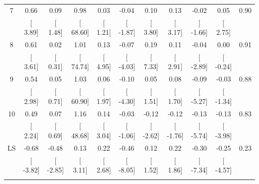 \documentclass[12pt]{article}
\begin{document}
\begin{table}[!htbp]
\begin{tabular}{@{\extracolsep{0pt}} ccccccccccc}
7 & 0.66 & 0.09 & 0.98 & 0.03 & -0.04 & 0.10 & 0.13 & -0.02 & 0.05 & 0.90 \\ 
 & [ 3.89] & [ 1.48] & [ 68.60] & [ 1.21] & [ -1.87] & [ 3.80] & [ 3.17] & [ -1.66] & [ 2.75] &  \\ 
8 & 0.61 & 0.02 & 1.01 & 0.13 & -0.07 & 0.19 & 0.11 & -0.04 & 0.00 & 0.91 \\ 
 & [ 3.61] & [ 0.31] & [ 74.74] & [ 4.95] & [ -4.03] & [ 7.33] & [ 2.91] & [ -2.89] & [ -0.24] &  \\ 
9 & 0.54 & 0.05 & 1.03 & 0.06 & -0.10 & 0.05 & 0.08 & -0.09 & -0.03 & 0.88 \\ 
 & [ 2.98] & [ 0.71] & [ 60.90] & [ 1.97] & [ -4.30] & [ 1.51] & [ 1.70] & [ -5.27] & [ -1.34] &  \\ 
10 & 0.49 & 0.07 & 1.16 & 0.14 & -0.03 & -0.12 & -0.12 & -0.13 & -0.13 & 0.83 \\ 
 & [ 2.24] & [ 0.69] & [ 48.68] & [ 3.04] & [ -1.06] & [ -2.62] & [ -1.76] & [ -5.74] & [ -3.98] &  \\ 
LS & -0.68 & -0.48 & 0.13 & 0.22 & -0.46 & 0.12 & 0.22 & -0.30 & -0.25 & 0.23 \\ 
 & [ -3.82] & [ -2.85] & [ 3.11] & [ 2.68] & [ -8.05] & [ 1.52] & [ 1.86] & [ -7.34] & [ -4.57] &  \\ 
\hline \\[-1.8ex] 
\end{tabular} 
\end{table} 

\vspace{1cm}
\end{document}
